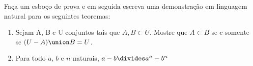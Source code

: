 \begin{exercise}
Faça um esboço de prova e em seguida escreva uma demonstração em linguagem natural para os seguintes teoremas:
\begin{enumerate}
	\item Sejam A, B e U conjuntos tais que $A, B \subset U$. Mostre que $A \subset B$ se e somente se $(U - A) \union B = U$.
	\item Para todo $a$, $b$ e $n$ naturais, $ a - b \divides a^n - b^n $  
\end{enumerate}
\end{exercise}

